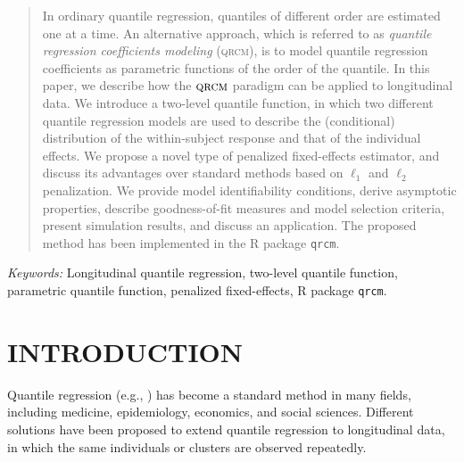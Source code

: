 \documentclass[12pt]{article}
\def\QRCM{\textsc{qrcm}}
\begin{document}


\bigskip
\begin{abstract}
In ordinary quantile regression, quantiles of different order are estimated one at a time.
An alternative approach, which is referred to as \textit{quantile regression coefficients modeling} (\QRCM), 
is to model quantile regression coefficients as parametric functions of the order of the quantile.
In this paper, we describe how the $\QRCM$ paradigm can be applied to longitudinal data.
We introduce a two-level quantile function, in which two different quantile regression models
are used to describe the (conditional) distribution of the within-subject response and that
of the individual effects. We propose a novel type of penalized fixed-effects estimator,
and discuss its advantages over standard methods based on $\ell_1$ and $\ell_2$ penalization. We provide model identifiability conditions, derive asymptotic properties,
describe goodness-of-fit measures and model selection criteria, present simulation results, and 
discuss an application. The proposed method has been implemented in the R package \texttt{qrcm}.
\end{abstract}

\noindent%
{\it Keywords:} Longitudinal quantile regression, two-level quantile function, parametric quantile function, penalized fixed-effects, R package \texttt{qrcm}.
\vfill

\newpage
{} %



\section{INTRODUCTION}

Quantile regression (e.g., \citealp{kb, koenker}) has become a standard method 
in many fields, including medicine, epidemiology, economics, and social sciences. 
Different solutions have been proposed to extend quantile regression to 
longitudinal data, in which the same individuals or clusters are observed repeatedly.
\end{document}
